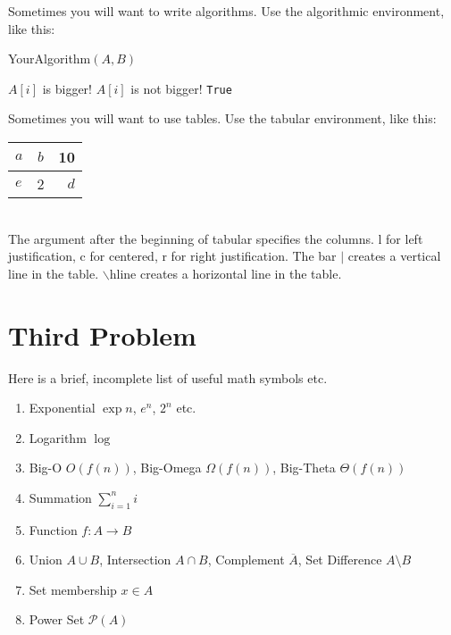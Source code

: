 \documentclass[paper=a4, fontsize=11pt]{scrartcl} %
\numberwithin{equation}{section} %
\numberwithin{figure}{section} %
\numberwithin{table}{section} %
\theoremstyle{definition}
\begin{document}
    Sometimes you will want to write algorithms. Use the algorithmic environment, like this:
    \begin{algorithm}
        \caption{YourAlgorithm$(A, B)$}
        \begin{algorithmic}
                \State $A[i]$ is bigger!
              \Else
                \State $A[i]$ is not bigger!
              \EndIf
          \EndFor
        \State \Return \texttt{True}
        \end{algorithmic}
        \end{algorithm}

    Sometimes you will want to use tables. Use the tabular environment, like this:\\

      \begin{tabular}{|l|cr|}
      $a$ & $b$ & 10\\ \hline
      $e$ & 2 & $d$\\
      \end{tabular}\\

    The argument after the beginning of tabular specifies the columns. l for left justification, c for centered, r for right justification. The bar $|$ creates a vertical line in the table. $\backslash$hline creates a horizontal line in the table.

\section{Third Problem}
    Here is a brief, incomplete list of useful math symbols etc.
    \begin{enumerate}
        \item Exponential $\exp{n}$, $e^n$, $2^n$ etc.
        \item Logarithm $\log$
        \item Big-O $O(f(n))$, Big-Omega $\Omega(f(n))$, Big-Theta $\Theta(f(n))$
        \item Summation $\sum_{i=1}^n i$
        \item Function $f: A \to B$
        \item Union $A \cup B$, Intersection $A \cap B$, Complement $\overline{A}$, Set Difference $A \setminus B$
        \item Set membership $x \in A$
        \item Power Set $\mathcal{P}(A)$
    \end{enumerate}
\end{document}
